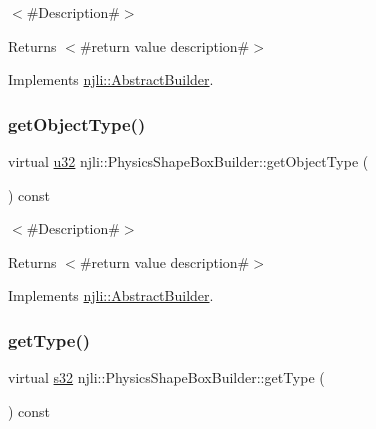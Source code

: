 $<$\#\+Description\#$>$

\begin{DoxyReturn}{Returns}
$<$\#return value description\#$>$ 
\end{DoxyReturn}


Implements \mbox{\hyperlink{classnjli_1_1_abstract_builder_a902f73ea78031b06aca183a417f3413b}{njli\+::\+Abstract\+Builder}}.

\mbox{\label{classnjli_1_1_physics_shape_box_builder_a1d1f75cc3ba31ea15c935260b2401e97}} 
\subsubsection{\texorpdfstring{get\+Object\+Type()}{getObjectType()}}
{\footnotesize\ttfamily virtual \mbox{\hyperlink{_util_8h_a10e94b422ef0c20dcdec20d31a1f5049}{u32}} njli\+::\+Physics\+Shape\+Box\+Builder\+::get\+Object\+Type (\begin{DoxyParamCaption}{ }\end{DoxyParamCaption}) const\hspace{0.3cm}{\ttfamily [virtual]}}

$<$\#\+Description\#$>$

\begin{DoxyReturn}{Returns}
$<$\#return value description\#$>$ 
\end{DoxyReturn}


Implements \mbox{\hyperlink{classnjli_1_1_abstract_builder_a0f2d344fcf697b167f4f2b1122b5fb33}{njli\+::\+Abstract\+Builder}}.

\mbox{\label{classnjli_1_1_physics_shape_box_builder_ac0de9c8dfd8cb0bf1499bdc5e916d022}} 
\subsubsection{\texorpdfstring{get\+Type()}{getType()}}
{\footnotesize\ttfamily virtual \mbox{\hyperlink{_util_8h_aa62c75d314a0d1f37f79c4b73b2292e2}{s32}} njli\+::\+Physics\+Shape\+Box\+Builder\+::get\+Type (\begin{DoxyParamCaption}{ }\end{DoxyParamCaption}) const\hspace{0.3cm}{\ttfamily [virtual]}}


